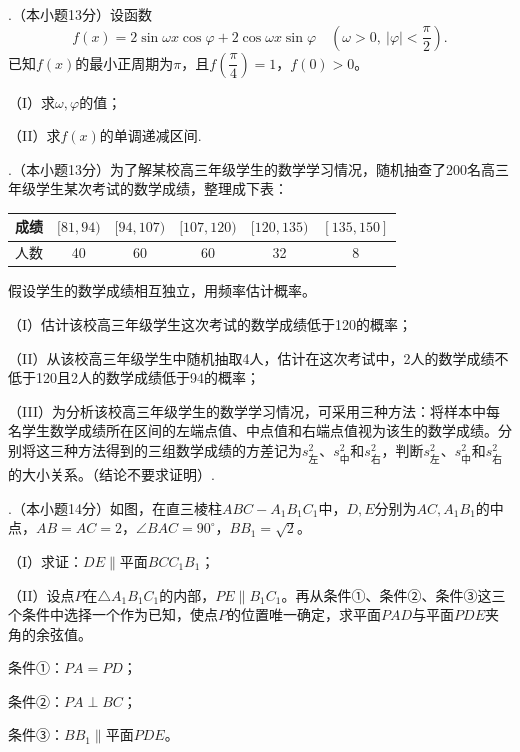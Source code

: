 .（本小题13分）设函数
\[
f(x)=2\sin\omega x\cos\varphi+2\cos\omega x\sin\varphi
\quad\left(\omega>0,\ |\varphi|<\frac\pi2\right).
\]
已知$f(x)$的最小正周期为$\pi$，且$f\left(\dfrac\pi4\right)=1$，$f(0)>0$。

\noindent（I）求$\omega,\varphi$的值；

\noindent（II）求$f(x)$的单调递减区间.

\newpage
{}.（本小题13分）为了解某校高三年级学生的数学学习情况，随机抽查了200名高三年级学生某次考试的数学成绩，整理成下表：

\begin{center}
\renewcommand{\arraystretch}{1.45}
\setlength{\tabcolsep}{1.25em}
\begin{tabular}{|c|c|c|c|c|c|}
\hline
成绩&$[81,94)$&$[94,107)$&$[107,120)$&$[120,135)$&$[135,150]$\\ \hline
人数&40&60&60&32&8\\ \hline
\end{tabular}
\end{center}

\noindent 假设学生的数学成绩相互独立，用频率估计概率。

\noindent（I）估计该校高三年级学生这次考试的数学成绩低于120的概率；

\noindent（II）从该校高三年级学生中随机抽取4人，估计在这次考试中，2人的数学成绩不低于120且2人的数学成绩低于94的概率；

\noindent（III）为分析该校高三年级学生的数学学习情况，可采用三种方法：将样本中每名学生数学成绩所在区间的左端点值、中点值和右端点值视为该生的数学成绩。分别将这三种方法得到的三组数学成绩的方差记为$s_{\text{左}}^2$、$s_{\text{中}}^2$和$s_{\text{右}}^2$，判断$s_{\text{左}}^2$、$s_{\text{中}}^2$和$s_{\text{右}}^2$的大小关系。（结论不要求证明）.

\newpage
{}.（本小题14分）如图，在直三棱柱$ABC-A_1B_1C_1$中，$D,E$分别为$AC,A_1B_1$的中点，$AB=AC=2$，$\angle BAC=90^\circ$，$BB_1=\sqrt2$。

\noindent（I）求证：$DE\parallel$平面$BCC_1B_1$；

\noindent（II）设点$P$在$\triangle A_1B_1C_1$的内部，$PE\parallel B_1C_1$。再从条件①、条件②、条件③这三个条件中选择一个作为已知，使点$P$的位置唯一确定，求平面$PAD$与平面$PDE$夹角的余弦值。

\noindent 条件①：$PA=PD$；

\noindent 条件②：$PA\perp BC$；

\noindent 条件③：$BB_1\parallel$平面$PDE$。

